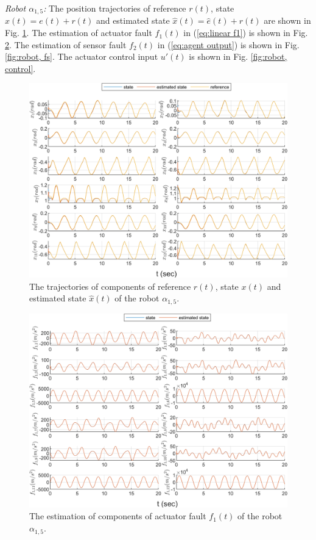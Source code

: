 \documentclass{ieeeaccess}
\begin{document}
\textit{Robot $\alpha_{1,5}$:}
The position trajectories of reference $r(t)$, state $x(t) = e(t) + r(t)$ and estimated state $\hat{x}(t) = \hat{e}(t) + r(t)$ are shown in Fig. \ref{fig:robot, state}. The estimation of actuator fault $f_1(t)$ in (\ref{eq:linear f1}) is shown in Fig. \ref{fig:robot, fa}. The estimation of sensor fault $f_2(t)$ in (\ref{eq:agent output}) is shown in Fig. \ref{fig:robot, fs}. The actuator control input $u'(t)$ is shown in Fig. \ref{fig:robot, control}.
\begin{figure}[htbp]
    \centering
    \includegraphics[scale=.57]{fig/robot (1).png}\caption{The trajectories of components of reference $r(t)$, state $x(t)$ and estimated state $\hat{x}(t)$ of the robot $\alpha_{1,5}$.}%
    \label{fig:robot, state}
\end{figure}
\begin{figure}[htbp]
    \centering
    \includegraphics[scale=.57]{fig/robot (2).png}\caption{The estimation of components of actuator fault $f_1(t)$ of the robot $\alpha_{1,5}$.}%
    \label{fig:robot, fa}
\end{figure}
\end{document}
